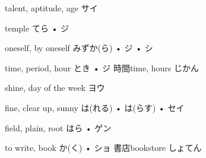



\setcounter{cardnum}{121}

		{talent, aptitude, age}
		{サイ}
		{}{}
		{}{}
		{}{}
		{}{}
		{}{}

		{temple}
		{てら • ジ}
		{}{}
		{}{}
		{}{}
		{}{}
		{}{}

		{oneself, by oneself}
		{みずか(ら) • ジ • シ}
		{}{}
		{}{}
		{}{}
		{}{}
		{}{}

		{time, period, hour}
		{とき • ジ}
		{時間}{time, hours じかん}
		{}{}
		{}{}
		{}{}
		{}{}

		{shine, day of the week}
		{ヨウ}
		{}{}
		{}{}
		{}{}
		{}{}
		{}{}

		{fine, clear up, sunny}
		{は(れる) • は(らす) • セイ}
		{}{}
		{}{}
		{}{}
		{}{}
		{}{}

		{field, plain, root}
		{はら • ゲン}
		{}{}
		{}{}
		{}{}
		{}{}
		{}{}

		{to write, book}
		{か(く) • ショ}
		{書店}{bookstore しょてん}
		{}{}
		{}{}
		{}{}
		{}{}

